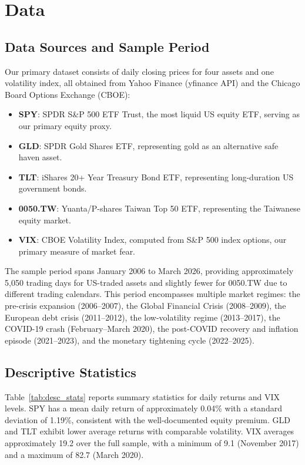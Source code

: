 \documentclass[12pt,a4paper]{article}
\begin{document}
\section{Data}
\label{sec:data}

\subsection{Data Sources and Sample Period}

Our primary dataset consists of daily closing prices for four assets and one volatility index, all obtained from Yahoo Finance (yfinance API) and the Chicago Board Options Exchange (CBOE):

\begin{itemize}
    \item \textbf{SPY}: SPDR S\&P 500 ETF Trust, the most liquid US equity ETF, serving as our primary equity proxy.
    \item \textbf{GLD}: SPDR Gold Shares ETF, representing gold as an alternative safe haven asset.
    \item \textbf{TLT}: iShares 20+ Year Treasury Bond ETF, representing long-duration US government bonds.
    \item \textbf{0050.TW}: Yuanta/P-shares Taiwan Top 50 ETF, representing the Taiwanese equity market.
    \item \textbf{VIX}: CBOE Volatility Index, computed from S\&P 500 index options, our primary measure of market fear.
\end{itemize}

The sample period spans January 2006 to March 2026, providing approximately 5,050 trading days for US-traded assets and slightly fewer for 0050.TW due to different trading calendars. This period encompasses multiple market regimes: the pre-crisis expansion (2006--2007), the Global Financial Crisis (2008--2009), the European debt crisis (2011--2012), the low-volatility regime (2013--2017), the COVID-19 crash (February--March 2020), the post-COVID recovery and inflation episode (2021--2023), and the monetary tightening cycle (2022--2025).

\subsection{Descriptive Statistics}

Table~\ref{tab:desc_stats} reports summary statistics for daily returns and VIX levels. SPY has a mean daily return of approximately 0.04\% with a standard deviation of 1.19\%, consistent with the well-documented equity premium. GLD and TLT exhibit lower average returns with comparable volatility. VIX averages approximately 19.2 over the full sample, with a minimum of 9.1 (November 2017) and a maximum of 82.7 (March 2020).
\end{document}
